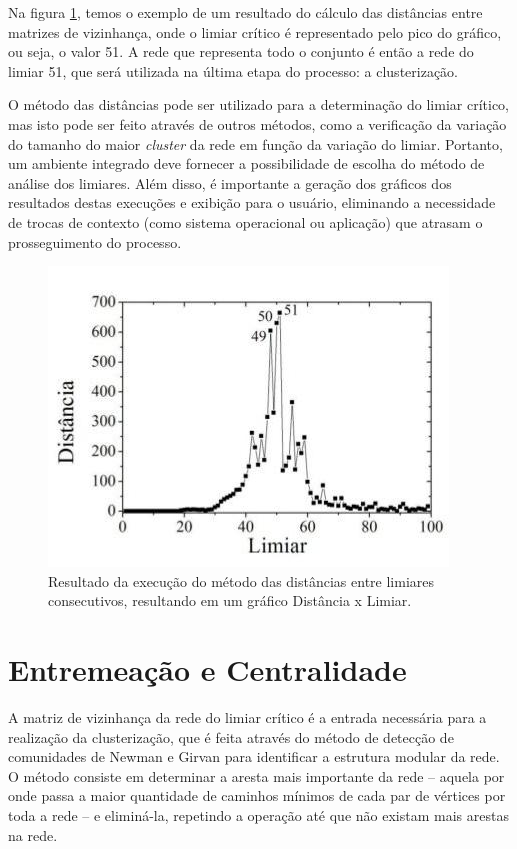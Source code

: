 Na figura \ref{fig:distancia}, temos o exemplo de um resultado do cálculo das distâncias entre matrizes de vizinhança, onde o limiar crítico é representado
pelo pico do gráfico, ou seja, o valor 51. A rede que representa todo o conjunto é então a rede do limiar 51, que será utilizada na última etapa do processo:
a clusterização.

O método das distâncias pode ser utilizado para a determinação do limiar crítico, mas isto pode ser feito através de outros métodos, como a verificação da
variação do tamanho do maior \textit{cluster} da rede em função da variação do limiar. Portanto, um ambiente integrado deve fornecer a possibilidade de
escolha do método de análise dos limiares. Além disso, é importante a geração dos gráficos dos resultados destas execuções e exibição para o usuário,
eliminando a necessidade de trocas de contexto (como sistema operacional ou aplicação) que atrasam o prosseguimento do processo.

\begin{figure}
\centering
\includegraphics[scale=0.58]{distancia}
\caption{Resultado da execução do método das distâncias entre limiares consecutivos, resultando em um gráfico Distância x Limiar.}
\label{fig:distancia}
\end{figure}

\section{Entremeação e Centralidade} \label{sec:entremeacao}

A matriz de vizinhança da rede do limiar crítico é a entrada necessária para a realização da clusterização, que é feita através do método de detecção
de comunidades de Newman e Girvan \cite{newman2004} para identificar a estrutura modular da rede. O método consiste em determinar a aresta mais importante
da rede – aquela por onde passa a maior quantidade de caminhos mínimos de cada par de vértices por toda a rede – e eliminá-la, repetindo a operação
até que não existam mais arestas na rede.

